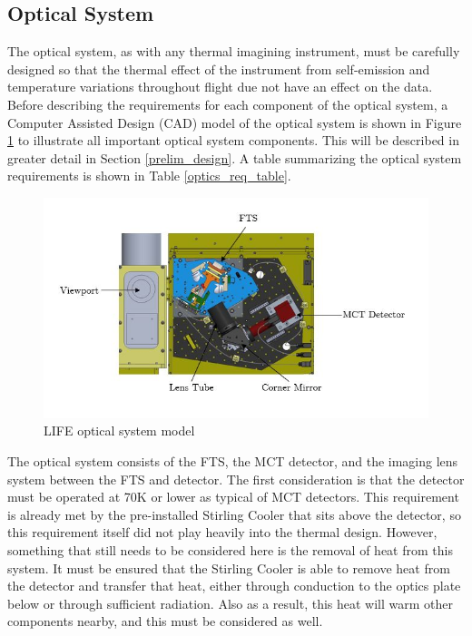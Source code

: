 \subsection{Optical System}
The optical system, as with any thermal imagining instrument, must be carefully designed so that the thermal effect of the instrument from self-emission and temperature variations throughout flight due not have an effect on the data. Before describing the requirements for each component of the optical system, a Computer Assisted Design (CAD) model of the optical system is shown in Figure \ref{fig:optical_system_diagram} to illustrate all important optical system components. This will be described in greater detail in Section \ref{prelim_design}. A table summarizing the optical system requirements is shown in Table \ref{optics_req_table}.

\begin{figure}[h]
\centering
  \includegraphics[width=\linewidth]{chap3_images/optical_system_diagram.JPG}
  \caption{LIFE optical system model}
  \label{fig:optical_system_diagram}
\end{figure}

The optical system consists of the FTS, the MCT detector, and the imaging lens system between the FTS and detector. The first consideration is that the detector must be operated at 70K or lower as typical of MCT detectors. This requirement is already met by the pre-installed Stirling Cooler that sits above the detector, so this requirement itself did not play heavily into the thermal design. However, something that still needs to be considered here is the removal of heat from this system. It must be ensured that the Stirling Cooler is able to remove heat from the detector and transfer that heat, either through conduction to the optics plate below or through sufficient radiation. Also as a result, this heat will warm other components nearby, and this must be considered as well.

